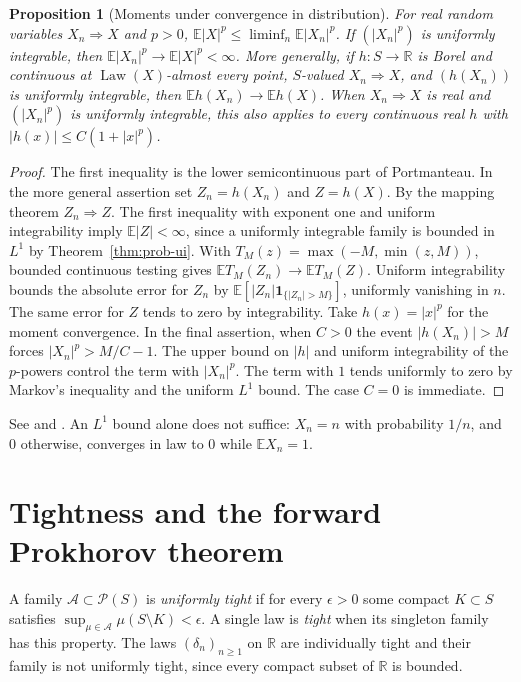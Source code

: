 \documentclass[11pt,oneside,openany]{book}
\newcommand{\E}{\mathbb{E}}
\newcommand{\R}{\mathbb{R}}
\DeclareMathOperator{\Law}{Law}
\newcommand{\ind}{\mathbf{1}}
\theoremstyle{plain}
\newtheorem{proposition}[theorem]{Proposition}
\theoremstyle{definition}
\theoremstyle{remark}
\begin{document}
\begin{proposition}[Moments under convergence in distribution]
\label{prop:p06-moments}
For real random variables \(X_n\Rightarrow X\) and \(p>0\),
\(\E |X|^p\leq\liminf_n\E|X_n|^p\).
If \((|X_n|^p)\) is uniformly integrable, then
\(\E |X_n|^p\to\E |X|^p<\infty\).
More generally, if \(h:S\to\R\) is Borel and continuous at
\(\Law(X)\)-almost every point, \(S\)-valued \(X_n\Rightarrow X\), and
\((h(X_n))\) is uniformly integrable, then
\(\E h(X_n)\to\E h(X)\). When \(X_n\Rightarrow X\) is real and
\((|X_n|^p)\) is uniformly integrable, this also applies to every
continuous real \(h\) with \(|h(x)|\leq C(1+|x|^p)\).
\end{proposition}

\begin{proof}
The first inequality is the lower semicontinuous part of
Portmanteau. In the more general assertion set \(Z_n=h(X_n)\) and
\(Z=h(X)\). By the mapping theorem \(Z_n\Rightarrow Z\). The first
inequality with exponent one and uniform integrability imply
\(\E|Z|<\infty\), since a uniformly integrable family is bounded in
\(L^1\) by Theorem~\ref{thm:prob-ui}. With
\(T_M(z)=\max(-M,\min(z,M))\), bounded continuous
testing gives \(\E T_M(Z_n)\to\E T_M(Z)\). Uniform integrability
bounds the absolute error for \(Z_n\) by
\(\E[|Z_n|\ind_{\{|Z_n|>M\}}]\), uniformly vanishing in \(n\).
The same error for \(Z\) tends to zero by integrability.
Take \(h(x)=|x|^p\) for the moment convergence.
In the final assertion, when \(C>0\) the event \(|h(X_n)|>M\)
forces \(|X_n|^p>M/C-1\). The upper bound on \(|h|\) and uniform
integrability of the \(p\)-powers control the term with \(|X_n|^p\).
The term with \(1\) tends uniformly to zero by Markov's inequality
and the uniform \(L^1\) bound. The case \(C=0\) is immediate.
\end{proof}

See \cite[Theorems 3.1--3.2 and 3.4--3.6, pp.~27--32]{Billingsley}
and \cite[Theorem 5.29, p.~118]{Kallenberg}. An \(L^1\) bound alone
does not suffice: \(X_n=n\) with probability \(1/n\), and \(0\)
otherwise, converges in law to \(0\) while \(\E X_n=1\).

\section{Tightness and the forward Prokhorov theorem}
\label{p06-05}

A family \(\mathcal A\subset\mathcal P(S)\) is \emph{uniformly tight}
if for every \(\epsilon>0\) some compact \(K\subset S\) satisfies
\(\sup_{\mu\in\mathcal A}\mu(S\setminus K)<\epsilon\). A single law is
\emph{tight} when its singleton family has this property. The laws
\((\delta_n)_{n\geq1}\) on \(\R\) are individually tight and their
family is not uniformly tight, since every compact subset of \(\R\)
is bounded.
\end{document}

